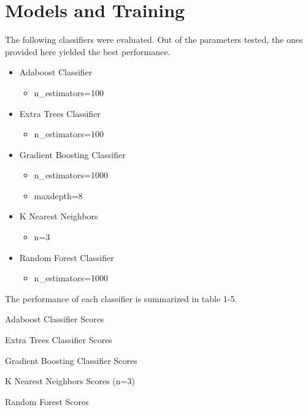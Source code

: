 \documentclass[twoside,11pt]{article}
\begin{document}
\clearpage
\section{Models and Training}
The following classifiers were evaluated. Out of the parameters tested, the ones provided
here yielded the best performance.
\begin{itemize}[noitemsep]
  \item  Adaboost Classifier
  \begin{itemize}[noitemsep]
    \item n\_estimators=100
  \end{itemize}
  \item  Extra Trees Classifier
  \begin{itemize}[noitemsep]
    \item n\_estimators=100
  \end{itemize}
  \item  Gradient Boosting Classifier
  \begin{itemize}[noitemsep]
    \item n\_estimators=1000
    \item max\-depth=8
  \end{itemize}
  \item  K Nearest Neighbors
  \begin{itemize}[noitemsep]
    \item n=3
  \end{itemize}
  \item  Random Forest Classifier
  \begin{itemize}[noitemsep]
    \item n\_estimators=1000
  \end{itemize}
\end{itemize}
The performance of each classifier is summarized in table 1-5.

\begin{table}[!htbp]
  \centering
  \caption{Adaboost Classifier Scores}
\end{table}
\vspace{-2em}
\begin{table}[!htbp]
  \centering
  \caption{Extra Trees Classifier Scores}
\end{table}
\vspace{-2em}
\begin{table}[!htbp]
  \centering
  \caption{Gradient Boosting Classifier Scores}
\end{table}
\vspace{-2em}
\begin{table}[!htbp]
  \centering
  \caption{K Nearest Neighbors Scores (n=3)}
\end{table}
\vspace{-2em}
\begin{table}[!htbp]
  \centering
  \caption{Random Forest Scores}
\end{table}
\newpage
\end{document}
